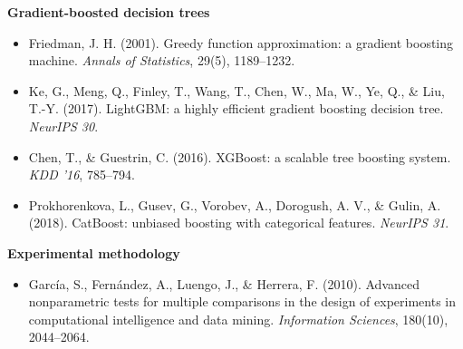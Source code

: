 \documentclass[
  11pt,
]{article}
\providecommand{\tightlist}{%
  \setlength{\itemsep}{0pt}\setlength{\parskip}{0pt}}
\begin{document}
\textbf{Gradient-boosted decision trees}

\begin{itemize}
\tightlist
\item
  Friedman, J. H. (2001). Greedy function approximation: a gradient
  boosting machine. \emph{Annals of Statistics}, 29(5), 1189--1232.
\item
  Ke, G., Meng, Q., Finley, T., Wang, T., Chen, W., Ma, W., Ye, Q., \&
  Liu, T.-Y. (2017). LightGBM: a highly efficient gradient boosting
  decision tree. \emph{NeurIPS 30}.
\item
  Chen, T., \& Guestrin, C. (2016). XGBoost: a scalable tree boosting
  system. \emph{KDD '16}, 785--794.
\item
  Prokhorenkova, L., Gusev, G., Vorobev, A., Dorogush, A. V., \& Gulin,
  A. (2018). CatBoost: unbiased boosting with categorical features.
  \emph{NeurIPS 31}.
\end{itemize}

\textbf{Experimental methodology}

\begin{itemize}
\tightlist
\item
  García, S., Fernández, A., Luengo, J., \& Herrera, F. (2010). Advanced
  nonparametric tests for multiple comparisons in the design of
  experiments in computational intelligence and data mining.
  \emph{Information Sciences}, 180(10), 2044--2064.
\end{itemize}
\end{document}
